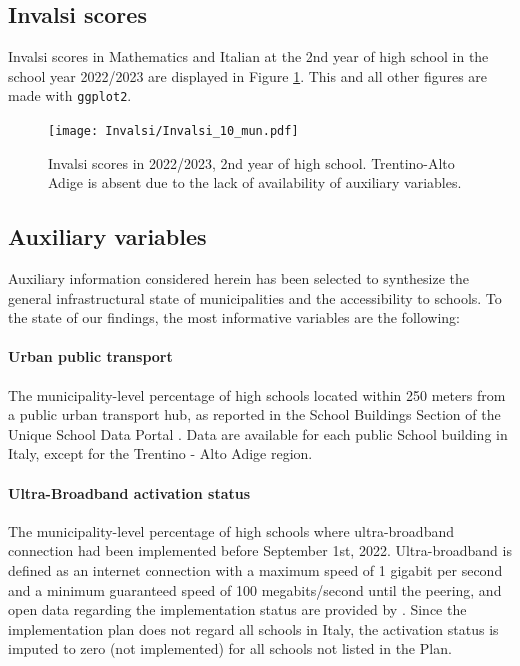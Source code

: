 \documentclass[openany]{book}
\begin{document}
\subsection{Invalsi scores}\label{Par:Invalsi} 


Invalsi scores in Mathematics and Italian at the 2nd year of high school in the school year 2022/2023 are displayed in Figure \ref{fig:Invalsi}. This and all other figures are made with \texttt{ggplot2}.
\begin{figure}
  \centering
  \texttt{[image: Invalsi/Invalsi\_10\_mun.pdf]} 
  \caption{Invalsi scores in 2022/2023, 2nd year of high school.  Trentino-Alto Adige is absent due to the lack of availability of auxiliary variables.}
  \label{fig:Invalsi}
\end{figure}

\subsection{Auxiliary variables}  \label{Covariates}
Auxiliary information considered herein has been selected to synthesize the general infrastructural state of municipalities and the accessibility to schools. To the state of our findings, the most informative variables are the following:
\paragraph{Urban public transport} The municipality-level percentage of high schools located within 250 meters from a public urban transport hub, as reported in the School Buildings Section of the Unique School Data Portal \citep{MIUR}. Data are available for each public School building in Italy, except for the Trentino - Alto Adige region.  
 
\paragraph{Ultra-Broadband activation status} The municipality-level percentage of high schools where ultra-broadband connection had been implemented before September 1st, 2022. Ultra-broadband is defined as an internet connection with a maximum speed of 1 gigabit per second and a minimum guaranteed speed of 100 megabits/second until the peering, and open data regarding the implementation status are provided by \cite{BB}. Since the implementation plan does not regard all schools in Italy, the activation status is imputed to zero (not implemented) for all schools not listed in the Plan.
\end{document}
